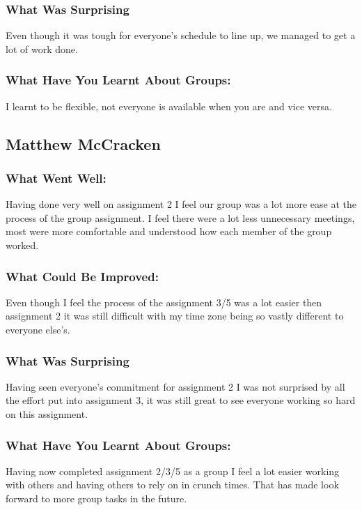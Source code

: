 \documentclass[11pt, oneside, a4paper, titlepage]{article}
\begin{document}
\subsubsection{What Was Surprising}
Even though it was tough for everyone's schedule to line up, we managed to get a lot of work done. 

\subsubsection{What Have You Learnt About Groups:}
I learnt to be flexible, not everyone is available when you are and vice versa. 

\subsection{Matthew McCracken}
\subsubsection{What Went Well:}
Having done very well on assignment 2 I feel our group was a lot more ease at the process of the group assignment. I feel there were a lot less unnecessary meetings, most were more comfortable and understood how each member of the group worked. 

\subsubsection{What Could Be Improved:}
Even though I feel the process of the assignment 3/5 was a lot easier then assignment 2 it was still difficult with my time zone being so vastly different to everyone else’s.

\subsubsection{What Was Surprising}
Having seen everyone’s commitment for assignment 2 I was not surprised by all the effort put into assignment 3, it was still great to see everyone working so hard on this assignment.

\subsubsection{What Have You Learnt About Groups:}
Having now completed assignment 2/3/5 as a group I feel a lot easier working with others and having others to rely on in crunch times. That has made look forward to more group tasks in the future.
\end{document}
